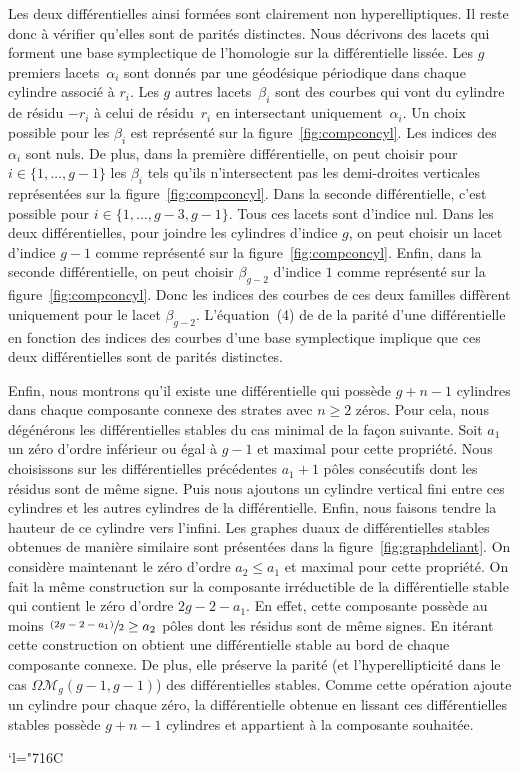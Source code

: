 \documentclass[JEP,XML,SOM,Unicode,francais,NoFloatCountersInSection,published]{cedram}
\let\mathcal\mathscr
\newcommand{\Changelback}{\mathcode`l="716C}
\newcommand{\psfrac}[2]{\sfrac{(#1)}{#2}}
\newcommand{\omoduli}[1][g]{{\Omega\mathcal M}_{\!#1}}
\theoremstyle{definition}
\begin{document}
Les deux différentielles ainsi formées sont clairement non hyperelliptiques. Il reste donc à vérifier qu'elles sont de parités distinctes. Nous décrivons des lacets qui forment une base symplectique de l'homologie sur la différentielle lissée. Les $g$ premiers lacets~$\alpha_{i}$ sont donnés par une géodésique périodique dans chaque cylindre associé à $r_{i}$. Les $g$ autres lacets~$\beta_{i}$ sont des courbes qui vont du cylindre de résidu $-r_{i}$ à celui de résidu~$r_{i}$ en intersectant uniquement~$\alpha_{i}$. Un choix possible pour les $\beta_{i}$ est représenté sur la figure~\ref{fig:compconcyl}. Les indices des~$\alpha_{i}$ sont nuls. De plus, dans la première différentielle, on peut choisir pour $i\in\{1,\dots,g-1\}$ les $\beta_{i}$ tels qu'ils n'intersectent pas les demi-droites verticales représentées sur la figure~\ref{fig:compconcyl}. Dans la seconde différentielle, c'est possible pour $i\in\{ 1,\dots,g-3,g-1 \}$. Tous ces lacets sont d'indice nul. Dans les deux différentielles, pour joindre les cylindres d'indice $g$, on peut choisir un lacet d'indice $g-1$ comme représenté sur la figure~\ref{fig:compconcyl}. Enfin, dans la seconde différentielle, on peut choisir $\beta_{g-2}$ d'indice $1$ comme représenté sur la figure~\ref{fig:compconcyl}. Donc les indices des courbes de ces deux familles diffèrent uniquement pour le lacet $\beta_{g-2}$. L'équation~(4) de \cite{kozo} de la parité d'une différentielle en fonction des indices des courbes d'une base symplectique implique que ces deux différentielles sont de parités distinctes.

Enfin, nous montrons qu'il existe une différentielle qui possède $g+n-1$ cylindres dans chaque composante connexe des strates avec $n\geq2$ zéros. Pour cela, nous dégénérons les différentielles stables du cas minimal de la façon suivante. Soit $a_{1}$ un zéro d'ordre inférieur ou égal à $g-1$ et maximal pour cette propriété. Nous choisissons sur les différentielles précédentes $a_{1}+1$ pôles consécutifs dont les résidus sont de même signe. Puis nous ajoutons un cylindre vertical fini entre ces cylindres et les autres cylindres de la différentielle. Enfin, nous faisons tendre la hauteur de ce cylindre vers l'infini. Les graphes duaux de différentielles stables obtenues de manière similaire sont présentées dans la figure~\ref{fig:graphdeliant}. On considère maintenant le zéro d'ordre $a_{2}\leq a_{1}$ et maximal pour cette propriété. On fait la même construction sur la composante irréductible de la différentielle stable qui contient le zéro d'ordre $2g-2-a_{1}$. En effet, cette composante possède au moins $\psfrac{2g-2-a_{1}}{2} \geq a_{2}$ pôles dont les résidus sont de même signes. En itérant cette construction on obtient une différentielle stable au bord de chaque composante connexe. De plus, elle préserve la parité (et l'hyperellipticité dans le cas $\omoduli(g-1,g-1)$) des différentielles stables. Comme cette opération ajoute un cylindre pour chaque zéro, la différentielle obtenue en lissant ces différentielles stables possède $g+n-1$ cylindres et appartient à la composante souhaitée.

\Changelback
\backmatter


\end{document}
